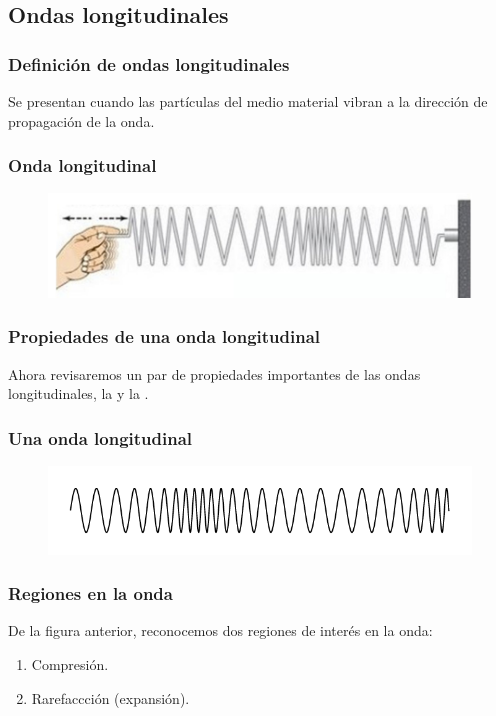 \documentclass[14pt]{beamer}
\begin{document}
\subsection{Ondas longitudinales}

\begin{frame}
\frametitle{Definición de ondas longitudinales}
Se presentan cuando las partículas del medio material vibran  a la dirección de propagación de la onda.
\end{frame}
\begin{frame}
\frametitle{Onda longitudinal}
\begin{figure}
    \centering
    \includegraphics[scale=0.35]{Imagenes/Ondas_07.jpg}
\end{figure}
\end{frame}
\begin{frame}
\frametitle{Propiedades de una onda longitudinal}
Ahora revisaremos un par de propiedades importantes de las ondas longitudinales, la  \pause y la .
\end{frame}
\begin{frame}
\frametitle{Una onda longitudinal}
\begin{figure}
    \centering
    \includegraphics[scale=0.5]{Imagenes/Reflexion_Ondas_05.png}
\end{figure}
\end{frame}
\begin{frame}
\frametitle{Regiones en la onda}
De la figura anterior, reconocemos dos regiones de interés en la onda:
\pause
{}
\begin{enumerate}[<+->]
\item Compresión.
\item Rarefaccción (expansión).
\end{enumerate}
\end{frame}
\end{document}
